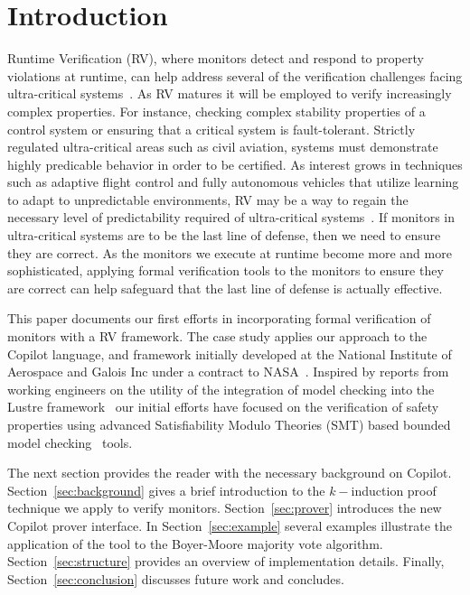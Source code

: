 \section{Introduction}\label{sec:intro}
Runtime Verification (RV), where monitors detect and respond to
property violations at runtime, can help address several of the
verification challenges facing ultra-critical
systems~\cite{pike-rv-11}.  As RV matures
it will be employed to verify increasingly complex 
properties. For instance, checking complex stability properties of a
control system or ensuring that a critical system is fault-tolerant.
Strictly regulated ultra-critical areas such as civil aviation,
systems must demonstrate highly predicable behavior in order to be
certified. As interest grows in techniques such as adaptive flight
control and fully autonomous vehicles that utilize learning to adapt
to unpredictable environments, RV may be a way to regain the necessary
level of predictability required of ultra-critical
systems~\cite{simplex}.  If
monitors in ultra-critical systems are to be the last line of defense,
then we need to ensure they are correct.  As the monitors we execute
at runtime become more and more sophisticated, applying formal
verification tools to the monitors to ensure they are correct can help
safeguard that the last line of defense is actually effective. 


This paper documents our first efforts in incorporating formal
verification of monitors with a RV framework.  The case study applies
our approach to the Copilot language, and framework initially
developed at the National Institute of Aerospace and Galois Inc under
a contract to NASA~\cite{copilot,pike-isse-13}.  Inspired by reports
from working engineers on the utility of the integration of model
checking into the Lustre framework~\cite{Hagen08} our initial efforts
have focused on the verification of safety properties using advanced
Satisfiability Modulo Theories (SMT) based bounded model
checking~\cite{ClarkeBounded01} tools.

 
The next section provides the reader with the necessary background on
Copilot. Section~\ref{sec:background}  gives a brief introduction to
the 
$k-$induction proof technique we apply to verify monitors. Section~\ref{sec:prover} introduces the new Copilot prover interface. In Section~\ref{sec:example}  several examples illustrate the
application of the tool to the Boyer-Moore majority vote
algorithm. Section~\ref{sec:structure} provides an overview of
implementation details. Finally, Section~\ref{sec:conclusion}
discusses future work and concludes. 


